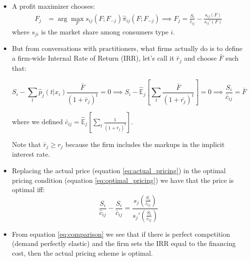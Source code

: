 \documentclass[12pt]{article}
\theoremstyle{plain}
\theoremstyle{plain}
\begin{document}
\begin{itemize}

\item A profit maximizer chooses:  
\begin{align}\label{eq:optimal_pricing}
F_j&=\arg\max_{F}s_{ij}(F;F_{-j})\hat{\pi}_{ij}(F;F_{-j})
\implies F_j=\frac{S_{i}}{\hat{c}_{ij}}-\frac{s_{ij}(F)}{s_{ij}'(F)}
\end{align}
where $s_{ji}$ is the market share among consumers type $i$. 



\item But from conversations with practitioners, what firms actually do
is to define a firm-wide Internal Rate of Return (IRR), let's call
it $\bar{r}_{j}$ and choose $\bar{F}$ such that: 

\begin{equation}\label{eq:actual_pricing}
S_{i}-\sum_{t}\hat{p}_{j}(t|x_{i}) \frac{\bar{F}}{(1+\bar{r}_{j})^{t}}=0
\implies S_{i}-\hat{\mathbb{E}}_j\left[\sum_{t}\frac{\bar{F}}{(1+\bar{r_{j}})^{t}}\right]=0
\implies\frac{S_{i}}{\bar{c}_{ij}}=\bar{F}
\end{equation}

where we defined $\bar{c}_{ij}=\hat{\mathbb{E}}_{j}\left[\sum_{t}\frac{1}{(1+\bar{r}_{j})^{t}}\right]$.

 
Note that $\bar{r}_{j}\geq r_{j}$ because the firm includes the markups in the implicit interest rate.  

\item Replacing the actual price (equation \ref{eq:actual_pricing}) in the optimal pricing condition (equation \ref{eq:optimal_pricing}) we have
that the price is optimal iff: 
\begin{equation}\label{eq:comparison}
\frac{S_{i}}{\hat{c}_{ij}}-\frac{S_{i}}{\bar{c}_{ij}}=\frac{s_{j}\left(\frac{S_{i}}{\bar{c}_{ij}}\right)}{s_{j}'\left(\frac{S_{i}}{\bar{c}_{ij}}\right)}
\end{equation}
\item From equation \ref{eq:comparison} we see that if there is perfect competition (demand perfectly elastic) and the firm sets the IRR equal to the financing cost,  then the actual pricing scheme
is optimal. 
\end{itemize}
\end{document}
